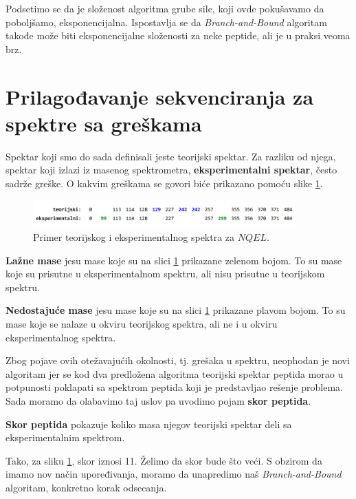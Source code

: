 Podsetimo se da je složenost algoritma grube sile, koji ovde pokušavamo da poboljšamo, eksponencijalna. Ispostavlja se da \textit{Branch-and-Bound} algoritam takođe može biti eksponencijalne složenosti za neke peptide, ali je u praksi veoma brz.



\section{Prilagođavanje sekvenciranja za spektre sa greškama} \label{greskeSpektri}

Spektar koji smo do sada definisali jeste teorijski spektar. Za razliku od njega, spektar koji izlazi iz masenog spektrometra, \textbf{eksperimentalni spektar}, često sadrže greške. O kakvim greškama se govori biće prikazano pomoću slike \ref{slika:ekspSpektar}.

\begin{figure}[h!]
	\centering
	\includegraphics[width=0.9\textwidth]{poglavlja/4/slike/ekspSpektar.png}
	\caption{Primer teorijskog i eksperimentalnog spektra za $NQEL$.}
	\label{slika:ekspSpektar}
\end{figure} 

\textbf{Lažne mase} jesu mase koje su na slici \ref{slika:ekspSpektar} prikazane zelenom bojom. To su mase koje su prisutne u eksperimentalnom spektru, ali nisu prisutne u teorijskom spektru.

\textbf{Nedostajuće mase} jesu mase koje su na slici \ref{slika:ekspSpektar} prikazane plavom bojom. To su mase koje se nalaze u okviru teorijskog spektra, ali ne i u okviru eksperimentalnog spektra.

Zbog pojave ovih otežavajućih okolnosti, tj. grešaka u spektru, neophodan je novi algoritam jer se kod dva predložena algoritma teorijski spektar peptida morao u potpunosti poklapati sa spektrom peptida koji je predstavljao rešenje problema. Sada moramo da olabavimo taj uslov pa uvodimo pojam \textbf{skor peptida}.

\begin{definicija}
\textbf{Skor peptida} pokazuje koliko masa njegov teorijski spektar deli sa eksperimentalnim spektrom.
\end{definicija}

\noindent Tako, za sliku \ref{slika:ekspSpektar}, skor iznosi 11. Želimo da skor bude što veći. S obzirom da imamo nov način upoređivanja, moramo da unapredimo naš \textit{Branch-and-Bound} algoritam, konkretno korak odsecanja. 

